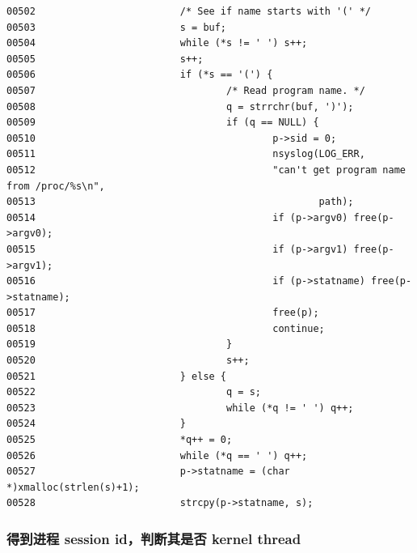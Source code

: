 {\begin{shaded}\begin{verbatim}
00502                         /* See if name starts with '(' */
00503                         s = buf;
00504                         while (*s != ' ') s++;
00505                         s++;
00506                         if (*s == '(') {
00507                                 /* Read program name. */
00508                                 q = strrchr(buf, ')');
00509                                 if (q == NULL) {
00510                                         p->sid = 0;
00511                                         nsyslog(LOG_ERR,
00512                                         "can't get program name from /proc/%s\n",
00513                                                 path);
00514                                         if (p->argv0) free(p->argv0);
00515                                         if (p->argv1) free(p->argv1);
00516                                         if (p->statname) free(p->statname);
00517                                         free(p);
00518                                         continue;
00519                                 }
00520                                 s++;
00521                         } else {
00522                                 q = s;
00523                                 while (*q != ' ') q++;
00524                         }
00525                         *q++ = 0;
00526                         while (*q == ' ') q++;
00527                         p->statname = (char *)xmalloc(strlen(s)+1);
00528                         strcpy(p->statname, s);
\end{verbatim}\end{shaded}}
\subsubsection{得到进程 session id，判断其是否 kernel thread}

